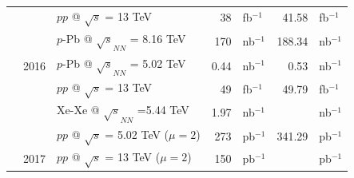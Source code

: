 \documentclass[encoding=utf8,british]{tumphthesis}
\begin{document}
\begin{table}[H]
\begin{tabular}{|c|r|l|rl|rl|}
\rowcolor[HTML]{CFE2F3} 
\cellcolor[HTML]{CFE2F3}                         & \cellcolor[HTML]{CFE2F3}                       & $pp$ @ $\sqrt{s}$ = 13 TeV                                         & 38                           & fb$^{-1}$                             & 41.58                                        & fb$^{-1}$                             \\
\cellcolor[HTML]{CFE2F3}                         & \cellcolor[HTML]{CFE2F3}                       & $p$-Pb @ $\sqrt{s}_{NN}$ = 8.16 TeV                                & 170                          & nb$^{-1}$                             & 188.34                                       & nb$^{-1}$                             \\
\rowcolor[HTML]{CFE2F3} 
\cellcolor[HTML]{CFE2F3}                         & \multirow{-3}{*}{\cellcolor[HTML]{CFE2F3}2016} & $p$-Pb @ $\sqrt{s}_{NN}$ = 5.02 TeV                                & 0.44                         & nb$^{-1}$                             & 0.53                                      & nb$^{-1}$                             \\
\cellcolor[HTML]{CFE2F3}                         &                                                & $pp$ @ $\sqrt{s}$ = 13 TeV                                         & 49                           & fb$^{-1}$                             & 49.79                                        & fb$^{-1}$  \\
\cellcolor[HTML]{CFE2F3}                         &                                                & \cellcolor[HTML]{CFE2F3}Xe-Xe @ $\sqrt{s}_{NN}$ =5.44 TeV          & \cellcolor[HTML]{CFE2F3}1.97 & \cellcolor[HTML]{CFE2F3}nb$^{-1}$     & \multicolumn{1}{l}{\cellcolor[HTML]{CFE2F3}} & \cellcolor[HTML]{CFE2F3}nb$^{-1}$      \\
\cellcolor[HTML]{CFE2F3}                         &                                                & $pp$ @ $\sqrt{s}$ = 5.02 TeV ($\mu = 2$)                           & 273                          & pb$^{-1}$                             & 341.29                                       & pb$^{-1}$                               \\
\cellcolor[HTML]{CFE2F3}                         & \multirow{-4}{*}{2017}                         & \cellcolor[HTML]{CFE2F3}$pp$ @ $\sqrt{s}$ = 13 TeV ($\mu = 2$)     & \cellcolor[HTML]{CFE2F3}150  & \cellcolor[HTML]{CFE2F3}pb$^{-1}$     & \multicolumn{1}{l}{\cellcolor[HTML]{CFE2F3}} & \cellcolor[HTML]{CFE2F3}pb$^{-1}$      \\

\end{tabular}
\end{table}
\end{document}
